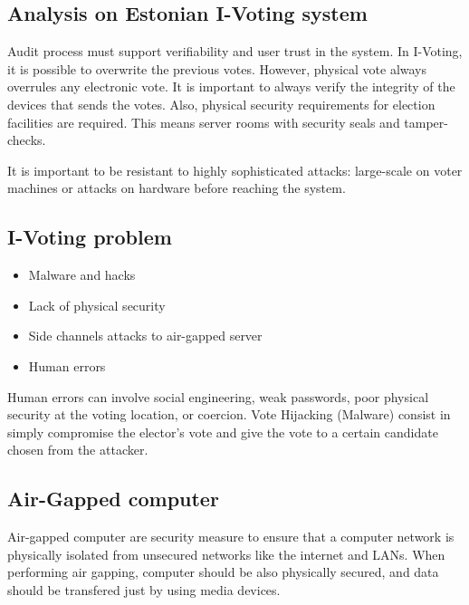 \subsection{Analysis on Estonian I-Voting system}

Audit process must support verifiability and user trust in the system. \newline
In I-Voting, it is possible to overwrite the previous votes. However, physical vote always overrules any electronic vote. \newline
It is important to always verify the integrity of the devices that sends the votes. Also, physical security requirements for election facilities are required. This means server rooms with security seals and tamper-checks.\newline

It is important to be resistant to highly sophisticated attacks: large-scale on voter machines or attacks on hardware before reaching the system. 

\subsection{I-Voting problem}

\begin{itemize}
    \item Malware and hacks
    \item Lack of physical security
    \item Side channels attacks to air-gapped server 
    \item Human errors
\end{itemize}

Human errors can involve social engineering, weak passwords, poor physical security at the voting location, or coercion. \newline
Vote Hijacking (Malware) consist in simply compromise the elector's vote and give the vote to a certain candidate chosen from the attacker. \newline

\subsection{Air-Gapped computer}
Air-gapped computer are security measure to ensure that a computer network is physically isolated from unsecured networks like the internet and LANs. 
When performing air gapping, computer should be also physically secured, and data should be transfered just by using media devices. \newline

